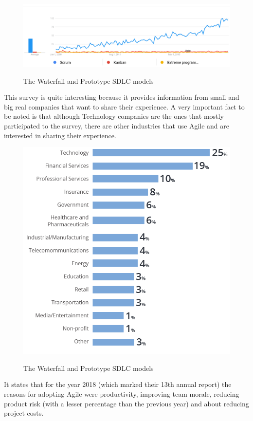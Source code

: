 	\begin{figure}[H]
		\centering
		\includegraphics[width=\textwidth]{resources/trends}\\
		\caption{The Waterfall and Prototype SDLC models}
	\end{figure}
	
	This survey is quite interesting because it provides information from small and big real companies that want to share their experience.
	A very important fact to be noted is that although Technology companies are the ones that mostly participated to the survey, there are other industries that use Agile and are interested in sharing their experience.

	\begin{figure}[H]
		\centering
		\includegraphics[width=.8\textwidth]{resources/Untitled_2}\\
		\caption{The Waterfall and Prototype SDLC models}
	\end{figure}

	It states that for the year 2018 (which marked their 13th annual report) the reasons for adopting Agile were productivity, improving team morale, reducing product risk (with a lesser percentage than the previous year) and about reducing project costs.


